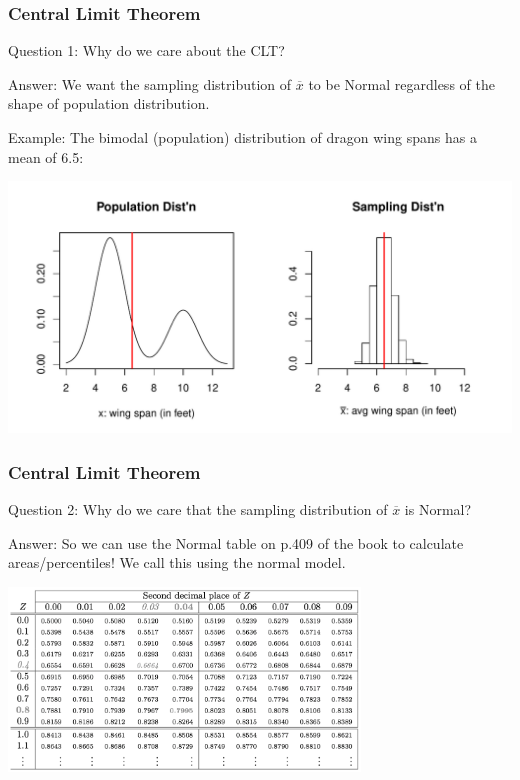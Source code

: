\documentclass[handout]{beamer}
\newcommand{\blue}[1]{\textcolor{blue2}{#1}}
\newcommand{\xbar}{\overline{x}}
\begin{document}
\begin{frame}
\frametitle{Central Limit Theorem}
\blue{Question 1}:  Why do we care about the CLT?

\vspace{0.25cm}

\blue{Answer}:  We want the sampling distribution of $\xbar$ to be Normal \blue{regardless} of the shape of population distribution.

\vspace{0.25cm}

\blue{Example}:  The bimodal (population) distribution of dragon wing spans has a mean of 6.5:

\begin{center}
\includegraphics[width=\textwidth]{figure/CLT2.pdf}
\end{center}

\end{frame}


\begin{frame}
\frametitle{Central Limit Theorem}
\blue{Question 2}:  Why do we care that the sampling distribution of $\xbar$ is Normal?

\vspace{0.25cm}

\pause\blue{Answer}:  So we can use the Normal table on p.409 of the book to calculate areas/percentiles!  We call this using the \blue{normal model}.

\vspace{0.25cm}

\begin{center}
\includegraphics[width=0.7\textwidth]{figure/normal_table.png}
\end{center}


\end{frame}
\end{document}
